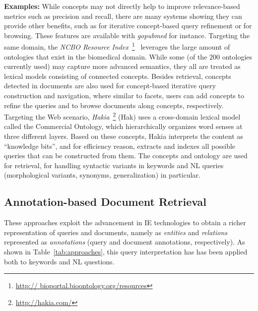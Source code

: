 \textbf{Examples:} While concepts may not directly help to improve relevance-based metrics such as precision and recall, there are many systems showing they can provide other benefits, such as for iterative concept-based query refinement or for browsing. These features are available with \emph{gopubmed} for instance. Targeting the same domain, the \emph{NCBO Resource Index}~\footnote{\url{http://
bioportal.bioontology.org/resources}}~\cite{DBLP:journals/ws/JonquetLFCNMS11} leverages the large amount of ontologies that exist in the biomedical domain. While some (of the 200 ontologies currently used) may capture more advanced semantics, they all are treated as lexical models consisting of connected concepts. Besides retrieval, concepts detected in documents are also used for concept-based iterative query construction and navigation, where similar to facets, users can add concepts to refine the queries and to browse documents along concepts, respectively. Targeting the Web scenario, \emph{Hakia}~\footnote{\url{http://hakia.com/}} (Hak) uses a cross-domain lexical model called the Commercial Ontology, which hierarchically organizes word senses at three different layers. Based on these concepts, Hakia interprets the content as ``knowledge bits'', and for efficiency reason, extracts and indexes all possible queries that can be constructed from them. The concepts and ontology are used for retrieval, for handling syntactic variants in keywords and NL queries (morphological variants, synonyms, generalization) in particular.  

\subsection{Annotation-based Document Retrieval} These approaches exploit the advancement in IE technologies to obtain a richer representation of queries and documents, namely as \emph{entities} and \emph{relations} represented as \emph{annotations} (query and document annotations, respectively). As shown in Table~\ref{tab:approaches}, this query interpretation has has been applied both to keywords and NL questions. 

